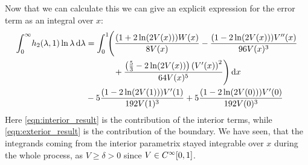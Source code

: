 Now that we can calculate this we can give an explicit expression for the error
term as an integral over $x$:
\begin{align}
  \Integ[\infty]{0}{\lambda}{
    h_2(\lambda, 1) \ln\lambda
  }
  &=
  \label{eqn:interior_result}
  \Int{x}{\Biggl(\frac{(1 + 2 \ln(2 V(x))) W(x)}{8 V(x)}
    - \frac{ (1 - 2 \ln(2 V(x)))V''(x)}{96 V(x)^{3}} \\
    &\hphantom{=\int_0^1\Biggl(}\mathbin{+} \frac{\left(\frac{5}{3} - 2\ln(2
    V(x))\right)\left(V'(x)\right)^{2}}{64 V(x)^{5}}\Biggr) } \nonumber \\
&\mathbin- 5\frac{(1 - 2\ln(2 V(1)))V'(1)}{192 V(1)^3}
+ 5\frac{(1 - 2 \ln(2 V(0)))V'(0)}{192 V(0)^3}
\label{eqn:exterior_result}
\end{align}
Here \eqref{eqn:interior_result} is the contribution of the interior terms,
while \eqref{eqn:exterior_result} is the contribution of the boundary. We have
seen, that the integrands coming from the interior parametrix stayed integrable
over $x$ during the whole process, as $V \geq \delta > 0$ since
$V\in C^\infty_{}{[0,1]}$.
